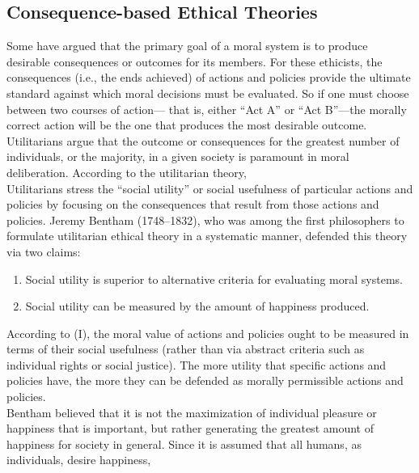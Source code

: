 \documentclass[12pt]{article}
\theoremstyle{definition}
\begin{document}
\subsection{Consequence-based Ethical Theories}
Some have argued that the primary goal of a moral system is to produce desirable
consequences or outcomes for its members. For these ethicists, the consequences (i.e., the
ends achieved) of actions and policies provide the ultimate standard against which moral
decisions must be evaluated. So if one must choose between two courses of action—
that is, either “Act A” or “Act B”—the morally correct action will be the one that
produces the most desirable outcome.\\
Utilitarians argue that the outcome or consequences for the greatest number of individuals, or the majority, in a given society is paramount in moral deliberation. According to the utilitarian theory, \\
Utilitarians stress the “social utility” or social usefulness of particular actions and
policies by focusing on the consequences that result from those actions and policies.
Jeremy Bentham (1748–1832), who was among the first philosophers to formulate
utilitarian ethical theory in a systematic manner, defended this theory via two claims:
\begin{enumerate}
\item Social utility is superior to alternative criteria for evaluating moral systems.
\item Social utility can be measured by the amount of happiness produced.
\end{enumerate}
According to (I), the moral value of actions and policies ought to be measured in
terms of their social usefulness (rather than via abstract criteria such as individual rights
or social justice). The more utility that specific actions and policies have, the more they
can be defended as morally permissible actions and policies.\\
Bentham believed that it is not the maximization of individual pleasure or
happiness that is important, but rather generating the greatest amount of happiness for
society in general. Since it is assumed that all humans, as individuals, desire happiness,
\end{document}
